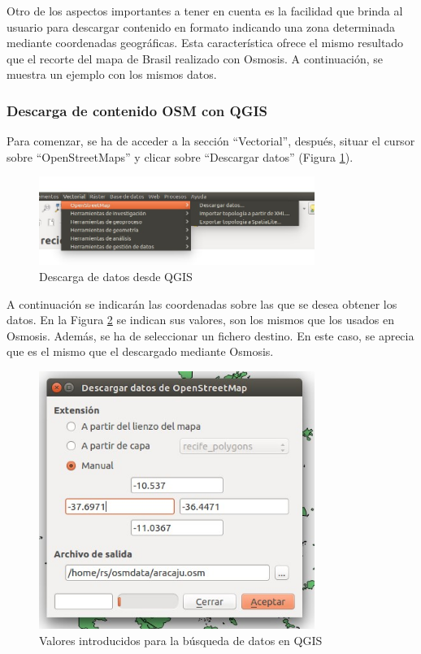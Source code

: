 Otro de los aspectos importantes a tener en cuenta es la facilidad que brinda al usuario para descargar contenido en formato indicando una zona determinada mediante coordenadas geográficas. Esta característica ofrece el mismo resultado que el recorte del mapa de Brasil realizado con Osmosis. A continuación, se muestra un ejemplo con los mismos datos.

\subsubsection{Descarga de contenido OSM con QGIS}
Para comenzar, se ha de acceder a la sección ``Vectorial'', después, situar el cursor sobre ``OpenStreetMaps'' y clicar sobre ``Descargar datos'' (Figura \ref{vectorial}).


\begin{figure}[h]
  \centering
    \includegraphics[width=0.8\textwidth]{../img/qgis/descarga.jpg}
  \caption{Descarga de datos desde QGIS}
  \label{vectorial}
\end{figure}

A continuación se indicarán las coordenadas sobre las que se desea obtener los datos. En la Figura \ref{datos} se indican sus valores, son los mismos que los usados en Osmosis. Además, se ha de seleccionar un fichero destino. En este caso, se aprecia que es el mismo que el descargado mediante Osmosis.

\begin{figure}[h]
  \centering
    \includegraphics[width=0.8\textwidth]{../img/qgis/datos_3.jpg}
  \caption{Valores introducidos para la búsqueda de datos en QGIS}
  \label{datos}
\end{figure}

